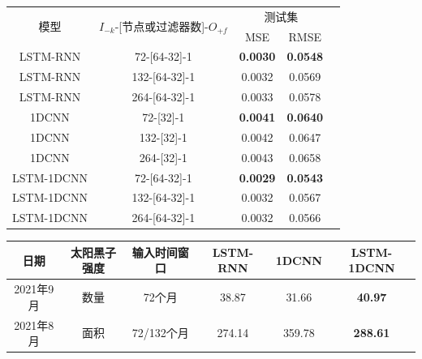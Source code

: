 \begin{table}[!htbp]
  \centering
  \label{tab:ss_number_out_1}
  \footnotesize
  \renewcommand{\arraystretch}{1}
  \begin{tabular}{ccccc}
    \toprule
    \multirow{2}{*}{模型} & \multirow{2}{*}{$I_{-k}$-[节点或过滤器数]-$O_{+f}$} & \multicolumn{2}{c}{测试集}\\
    \cmidrule(lr){3-4}
    \noalign{\smallskip}
    & & MSE & RMSE\\
    \midrule 
    LSTM-RNN & 72-[64-32]-1 & \textbf{0.0030} & \textbf{0.0548} \\
    LSTM-RNN & 132-[64-32]-1 & 0.0032 & 0.0569 \\
    LSTM-RNN & 264-[64-32]-1 & 0.0033 & 0.0578 \\
    \hline
    1DCNN & 72-[32]-1 & \textbf{0.0041} & \textbf{0.0640} \\
    1DCNN & 132-[32]-1 & 0.0042 & 0.0647 \\
    1DCNN & 264-[32]-1 & 0.0043 & 0.0658 \\
    \hline
    LSTM-1DCNN & 72-[64-32]-1 & \textbf{0.0029} & \textbf{0.0543} \\
    LSTM-1DCNN & 132-[64-32]-1 & 0.0032 & 0.0567 \\
    LSTM-1DCNN & 264-[64-32]-1 & 0.0032 & 0.0566 \\
    \bottomrule
  \end{tabular}
\end{table}

\begin{table}[!htbp]
  \centering
  \label{tab:ss_out_1}
  \footnotesize
  \begin{tabular}{cccccc}
    \toprule
    日期 & 太阳黑子强度 & 输入时间窗口 & LSTM-RNN & 1DCNN & LSTM-1DCNN  \\
    \midrule
    2021年9月 & 数量 & 72个月 & 38.87 & 31.66 & \textbf{40.97} \\
    2021年8月 & 面积 & 72/132个月 & 274.14 & 359.78 & \textbf{288.61} \\
    \bottomrule
  \end{tabular}
\end{table}

